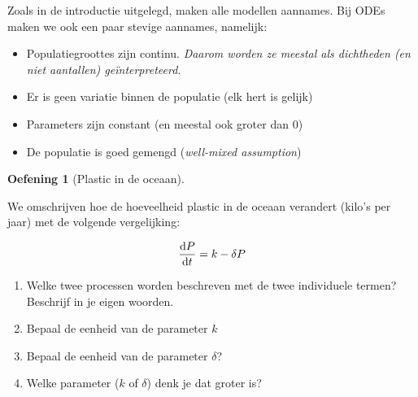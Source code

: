 \documentclass[
  a4paper,
]{scrbook}
\providecommand{\tightlist}{%
  \setlength{\itemsep}{0pt}\setlength{\parskip}{0pt}}\usepackage{longtable,booktabs,array}
\theoremstyle{definition}
\newtheorem{exercise}{Oefening}[chapter]
\theoremstyle{remark}
\begin{document}
\begin{tcolorbox}[enhanced jigsaw, rightrule=.15mm, opacityback=0, leftrule=.75mm, title=\textcolor{quarto-callout-tip-color}{\faLightbulb}\hspace{0.5em}{ODEs doen belangrijke aannames}, toptitle=1mm, titlerule=0mm, opacitybacktitle=0.6, colframe=quarto-callout-tip-color-frame, breakable, colbacktitle=quarto-callout-tip-color!10!white, coltitle=black, toprule=.15mm, bottomrule=.15mm, left=2mm, bottomtitle=1mm, arc=.35mm, colback=white]

Zoals in de introductie uitgelegd, maken alle modellen aannames. Bij
ODEs maken we ook een paar stevige aannames, namelijk:

\begin{itemize}
\tightlist
\item
  Populatiegroottes zijn continu. \emph{Daarom worden ze meestal als
  dichtheden (en niet aantallen) geïnterpreteerd. }
\item
  Er is geen variatie binnen de populatie (elk hert is gelijk)
\item
  Parameters zijn constant (en meestal ook groter dan \(0\))
\item
  De populatie is goed gemengd (\emph{well-mixed assumption})
\end{itemize}

\end{tcolorbox}

\begin{exercise}[Plastic in de
oceaan]\protect\hypertarget{exr-eenheden-tussen}{}\label{exr-eenheden-tussen}

We omschrijven hoe de hoeveelheid plastic in de oceaan verandert (kilo's
per jaar) met de volgende vergelijking:

\begin{align}
\mathchoice{\frac{\mathrm{d}P}
{\mathrm{d}t}}{\mathrm{d}P/\mathrm{d}t}
{\mathrm{d}P/\mathrm{d}t}
{\mathrm{d}P/\mathrm{d}t} = k - \delta P
\end{align}

\begin{enumerate}
\def\labelenumi{\alph{enumi}.}
\tightlist
\item
  Welke twee processen worden beschreven met de twee individuele termen?
  Beschrijf in je eigen woorden.
\item
  Bepaal de eenheid van de parameter \(k\)
\item
  Bepaal de eenheid van de parameter \(\delta\)?
\item
  Welke parameter (\(k\) of \(\delta\)) denk je dat groter is?
\end{enumerate}

\end{exercise}
\end{document}
